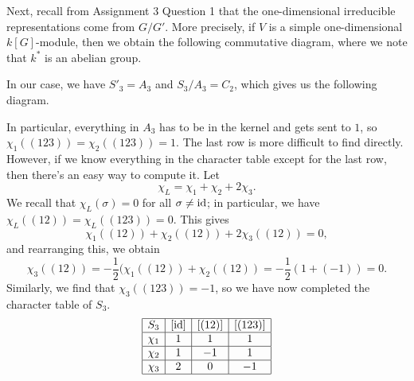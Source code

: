 \begin{exmp}
    Next, recall from Assignment 3 Question 1 that the one-dimensional 
    irreducible representations come from $G/G'$. More precisely, if 
    $V$ is a simple one-dimensional $k[G]$-module, then we obtain the following 
    commutative diagram, where we note that $k^*$ is an abelian group. 
    \begin{center}
    \end{center}
    In our case, we have $S'_3 = A_3$ and $S_3/A_3 = C_2$, which gives us 
    the following diagram. 
    \begin{center}
    \end{center}
    In particular, everything in $A_3$ has to be in the kernel and
    gets sent to $1$, so $\chi_1((123)) = \chi_2((123)) = 1$. 
    The last row is more difficult to find directly. However, if we know 
    everything in the character table except for the last row, then there's an 
    easy way to compute it. Let 
    \[ \chi_L = \chi_1 + \chi_2 + 2\chi_3. \] 
    We recall that $\chi_L(\sigma) = 0$ for all $\sigma \neq \operatorname{id}$; in particular, 
    we have $\chi_L((12)) = \chi_L((123)) = 0$. This gives 
    \[ \chi_1((12)) + \chi_2((12)) + 2\chi_3((12)) = 0, \] 
    and rearranging this, we obtain 
    \[ \chi_3((12)) = -\frac12(\chi_1((12)) + \chi_2((12)) 
    = -\frac12(1 + (-1)) = 0. \] 
    Similarly, we find that $\chi_3((123)) = -1$, so we have now completed the 
    character table of $S_3$. 
    \begin{align*}
        \begin{array}{|c|c|c|c|}
            \hline
            S_3    & [\operatorname{id}] & [(12)] & [(123)] \\ \hline
            \chi_1 & 1     & 1      & 1       \\ \hline
            \chi_2 & 1     & -1     & 1       \\ \hline
            \chi_3 & 2     & 0      & -1      \\ \hline
        \end{array} 
    \end{align*}
\end{exmp}

